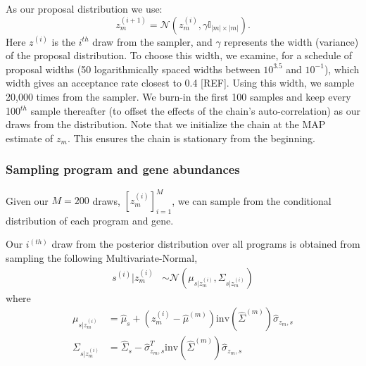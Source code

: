 \documentclass[10pt]{article}
\begin{document}
As our proposal distribution we use:
\[
z_m^{(i+1)} = \mathcal{N}\left( z_m^{(i)}, \gamma\mathbb{I}_{|m|\times |m|}\right).
\]
Here $z^{(i)}$ is the $i^{th}$ draw from the sampler, and $\gamma$ represents the width (variance) of the proposal distribution. To choose this width, we examine, for a schedule of proposal widths (50 logarithmically spaced widths between $10^{3.5}$ and $10^{-1}$), which width gives an acceptance rate closest to 0.4 [REF]. Using this width, we sample 20,000 times from the sampler. We burn-in the first 100 samples and keep every 100$^{th}$ sample thereafter (to offset the effects of the chain's auto-correlation) as our draws from the distribution. Note that we initialize the chain at the MAP estimate of $z_m$. This ensures the chain is stationary from the beginning.

\subsubsection{Sampling program and gene abundances} 
Given our $M = 200$ draws, $\left[z^{(i)}_m\right]_{i=1}^{M}$, we can sample from the conditional distribution of each program and gene.

Our $i^{(th)}$ draw from the posterior distribution over all programs is obtained from sampling the following Multivariate-Normal,
\begin{align*}
s^{(i)}|z^{(i)}_m & \sim \mathcal{N}\left(\mu_{s| z_{m}^{(i)}}, \Sigma_{s| z_{m}^{(i)}}  \right) 
\end{align*}
where
\begin{align*}
\mu_{s| z_{m}^{(i)}}  &= \hat{\mu}_s + \left(z_m^{(i)}  - \hat{\mu}^{(m)} \right)\textrm{inv}\left( \hat{\Sigma}^{(m)} \right)\hat{\sigma}_{z_{m},s} \\
\Sigma_{s| z_{m}^{(i)}} & = \hat{\Sigma}_{s} -  \hat{\sigma}_{z_{m},s}^T  \textrm{inv}\left( \hat{\Sigma}^{(m)} \right) \hat{\sigma}_{z_{m},s}
\end{align*}
\end{document}
